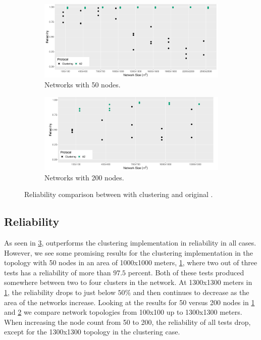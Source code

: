\begin{figure}[bt]
    \centering
    \begin{subfigure}{0.7\textwidth}
        \centering
        \includegraphics[width=\textwidth]{figure/Results/ChaosComparison/ChaosComparison_50_Reliability.pdf}
        \caption{Networks with 50 nodes.}
        \label{subfig:reliability-50-nodes}
    \end{subfigure}
    \hfill
    \begin{subfigure}{0.7\textwidth}
        \centering
        \includegraphics[width=\textwidth]{figure/Results/ChaosComparison/ChaosComparison_200_Reliability.pdf}
        \caption{Networks with 200 nodes.}
        \label{subfig:reliabilty-200-nodes}
    \end{subfigure}
    \caption{Reliability comparison between \atwo{} with clustering and original \atwo{}.}
    \label{fig:reliability-result}
\end{figure}
\subsection{Reliability}
\label{subsec:evaluation-reliability}
As seen in \cref{fig:reliability-result}, \atwo{} outperforms the clustering implementation in reliability in all cases. However, we see some promising results for the clustering implementation in the topology with 50 nodes in an area of 1000x1000 meters, \cref{subfig:reliability-50-nodes}, where two out of three tests has a reliability of more than $97.5$ percent. Both of these tests produced somewhere between two to four clusters in the network. At 1300x1300 meters in \cref{subfig:reliability-50-nodes}, the reliability drops to just below $50\%$ and then continues to decrease as the area of the networks increase. Looking at the results for 50 versus 200 nodes in \cref{subfig:reliability-50-nodes} and \cref{subfig:reliabilty-200-nodes} we compare network topologies from 100x100 up to 1300x1300 meters. When increasing the node count from 50 to 200, the reliability of all tests drop, except for the 1300x1300 topology in the clustering case.



